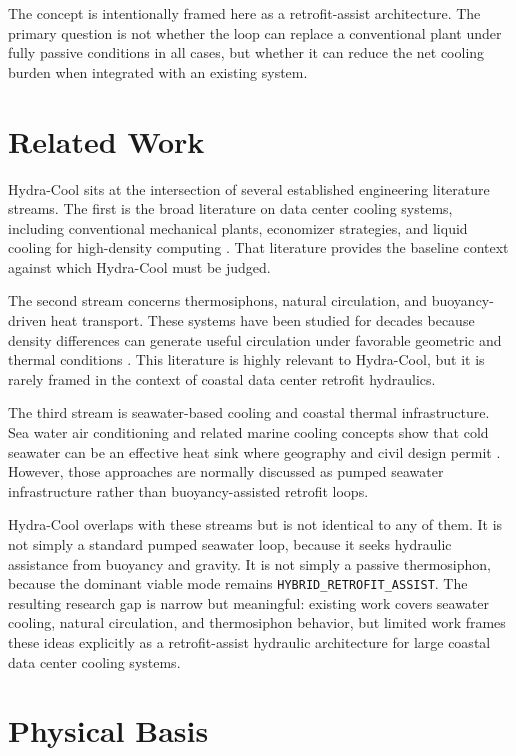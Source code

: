 \documentclass[11pt]{article}
\begin{document}
The concept is intentionally framed here as a retrofit-assist architecture. The primary question is not whether the loop can replace a conventional plant under fully passive conditions in all cases, but whether it can reduce the net cooling burden when integrated with an existing system.

\section{Related Work}

Hydra-Cool sits at the intersection of several established engineering literature streams. The first is the broad literature on data center cooling systems, including conventional mechanical plants, economizer strategies, and liquid cooling for high-density computing \citep{ebrahimi2014,masanet2020,shehabi2024,khalaj2017}. That literature provides the baseline context against which Hydra-Cool must be judged.

The second stream concerns thermosiphons, natural circulation, and buoyancy-driven heat transport. These systems have been studied for decades because density differences can generate useful circulation under favorable geometric and thermal conditions \citep{zhang2018,swart2020}. This literature is highly relevant to Hydra-Cool, but it is rarely framed in the context of coastal data center retrofit hydraulics.

The third stream is seawater-based cooling and coastal thermal infrastructure. Sea water air conditioning and related marine cooling concepts show that cold seawater can be an effective heat sink where geography and civil design permit \citep{sanjivy2023}. However, those approaches are normally discussed as pumped seawater infrastructure rather than buoyancy-assisted retrofit loops.

Hydra-Cool overlaps with these streams but is not identical to any of them. It is not simply a standard pumped seawater loop, because it seeks hydraulic assistance from buoyancy and gravity. It is not simply a passive thermosiphon, because the dominant viable mode remains \texttt{HYBRID\_RETROFIT\_ASSIST}. The resulting research gap is narrow but meaningful: existing work covers seawater cooling, natural circulation, and thermosiphon behavior, but limited work frames these ideas explicitly as a retrofit-assist hydraulic architecture for large coastal data center cooling systems.

\section{Physical Basis}
\end{document}
